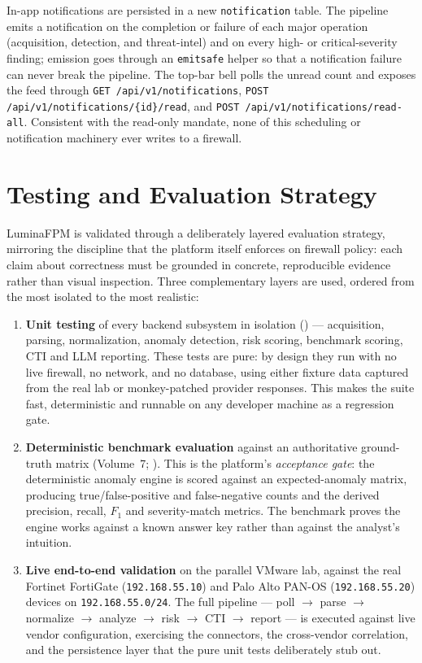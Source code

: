 \documentclass[12pt,a4paper]{report}
\renewcommand{\_}{\textunderscore\allowbreak}
\begin{document}
In-app notifications are persisted in a new \texttt{notification} table. The pipeline emits a notification on the completion or failure of each major operation (acquisition, detection, and threat-intel) and on every high- or critical-severity finding; emission goes through an \texttt{emit\_safe} helper so that a notification failure can never break the pipeline. The top-bar bell polls the unread count and exposes the feed through \texttt{GET /api/v1/notifications}, \texttt{POST /api/v1/notifications/\{id\}/read}, and \texttt{POST /api/v1/notifications/read-all}. Consistent with the read-only mandate, none of this scheduling or notification machinery ever writes to a firewall.

\section{Testing and Evaluation Strategy}
\label{sec:ch4-testing-strategy}

LuminaFPM is validated through a deliberately layered evaluation strategy, mirroring the discipline that the platform itself enforces on firewall policy: each claim about correctness must be grounded in concrete, reproducible evidence rather than visual inspection. Three complementary layers are used, ordered from the most isolated to the most realistic:

\begin{enumerate}[leftmargin=1.4em]
  \item \textbf{Unit testing} of every backend subsystem in isolation () --- acquisition, parsing, normalization, anomaly detection, risk scoring, benchmark scoring, CTI and LLM reporting. These tests are pure: by design they run with no live firewall, no network, and no database, using either fixture data captured from the real lab or monkey-patched provider responses. This makes the suite fast, deterministic and runnable on any developer machine as a regression gate.
  \item \textbf{Deterministic benchmark evaluation} against an authoritative ground-truth matrix (Volume~7; ). This is the platform's \emph{acceptance gate}: the deterministic anomaly engine is scored against an expected-anomaly matrix, producing true/false-positive and false-negative counts and the derived precision, recall, $F_1$ and severity-match metrics. The benchmark proves the engine works against a known answer key rather than against the analyst's intuition.
  \item \textbf{Live end-to-end validation} on the parallel VMware lab, against the real Fortinet FortiGate (\texttt{192.168.55.10}) and Palo Alto PAN-OS (\texttt{192.168.55.20}) devices on \texttt{192.168.55.0/24}. The full pipeline --- poll $\rightarrow$ parse $\rightarrow$ normalize $\rightarrow$ analyze $\rightarrow$ risk $\rightarrow$ CTI $\rightarrow$ report --- is executed against live vendor configuration, exercising the connectors, the cross-vendor correlation, and the persistence layer that the pure unit tests deliberately stub out.
\end{enumerate}
\end{document}
